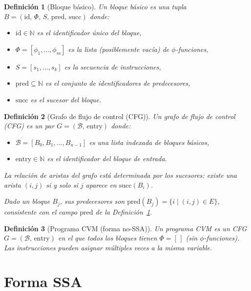 \documentclass[12pt, a4paper]{article}
\newtheorem{definition}{Definición}[section]
\begin{document}
\begin{definition}[Bloque básico]
\label{def:bloque}
Un \emph{bloque básico} es una tupla
$B = (\mathrm{id},\, \Phi,\, S,\, \mathrm{pred},\, \mathrm{succ})$ donde:
\begin{itemize}
  \item $\mathrm{id} \in \mathbb{N}$ es el identificador único del bloque,
  \item $\Phi = [\phi_1, \ldots, \phi_m]$ es la lista (posiblemente vacía) de $\phi$-funciones,
  \item $S = [s_1, \ldots, s_k]$ es la secuencia de instrucciones,
  \item $\mathrm{pred} \subseteq \mathbb{N}$ es el conjunto de identificadores de predecesores,
  \item $\mathrm{succ}$ es el sucesor del bloque.
\end{itemize}
\end{definition}

\begin{definition}[Grafo de flujo de control (CFG)]
\label{def:cfg}
Un \emph{grafo de flujo de control} (CFG) es un par $G = (\mathcal{B},\, \mathrm{entry})$ donde:
\begin{itemize}
  \item $\mathcal{B} = [B_0, B_1, \ldots, B_{n-1}]$ es una lista indexada de bloques básicos,
  \item $\mathrm{entry} \in \mathbb{N}$ es el identificador del bloque de entrada.
\end{itemize}
La relación de aristas del grafo está determinada por los sucesores: existe una arista $(i, j)$
si y solo si $j$ aparece en $\mathrm{succ}(B_i)$.

Dado un bloque $B_j$, sus \emph{predecesores} son $\mathrm{pred}(B_j) = \{i \mid (i,j) \in E\}$,
consistente con el campo $\mathrm{pred}$ de la Definición~\ref{def:bloque}.
\end{definition}

\begin{definition}[Programa CVM (forma no-SSA)]
Un \emph{programa CVM} es un CFG $G = (\mathcal{B},\, \mathrm{entry})$ en el que todos los
bloques tienen $\Phi = [\,]$ (sin $\phi$-funciones). Las instrucciones pueden asignar múltiples
veces a la misma variable.
\end{definition}

\section{Forma SSA}
\end{document}
